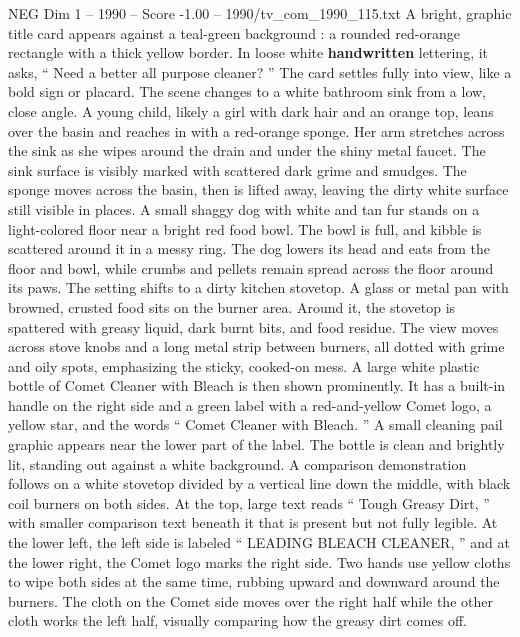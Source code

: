 \begin{textsample}{NEG Dim 1 – 1990 – Score -1.00 – 1990/tv\_com\_1990\_115.txt}  \label{ex:f1_neg_056}
A bright, graphic title card appears against a teal-green background : a rounded red-orange rectangle with a thick yellow border.
In loose white \textbf{handwritten} lettering, it asks, “ Need a better all purpose cleaner? ” The card settles fully into view, like a bold sign or placard.
The scene changes to a white bathroom sink from a low, close angle.
A young child, likely a girl with dark hair and an orange top, leans over the basin and reaches in with a red-orange sponge.
Her arm stretches across the sink as she wipes around the drain and under the shiny metal faucet.
The sink surface is visibly marked with scattered dark grime and smudges.
The sponge moves across the basin, then is lifted away, leaving the dirty white surface still visible in places.
A small shaggy dog with white and tan fur stands on a light-colored floor near a bright red food bowl.
The bowl is full, and kibble is scattered around it in a messy ring.
The dog lowers its head and eats from the floor and bowl, while crumbs and pellets remain spread across the floor around its paws.
The setting shifts to a dirty kitchen stovetop.
A glass or metal pan with browned, crusted food sits on the burner area.
Around it, the stovetop is spattered with greasy liquid, dark burnt bits, and food residue.
The view moves across stove knobs and a long metal strip between burners, all dotted with grime and oily spots, emphasizing the sticky, cooked-on mess.
A large white plastic bottle of Comet Cleaner with Bleach is then shown prominently.
It has a built-in handle on the right side and a green label with a red-and-yellow Comet logo, a yellow star, and the words “ Comet Cleaner with Bleach. ” A small cleaning pail graphic appears near the lower part of the label.
The bottle is clean and brightly lit, standing out against a white background.
A comparison demonstration follows on a white stovetop divided by a vertical line down the middle, with black coil burners on both sides.
At the top, large text reads “ Tough Greasy Dirt, ” with smaller comparison text beneath it that is present but not fully legible.
At the lower left, the left side is labeled “ LEADING BLEACH CLEANER, ” and at the lower right, the Comet logo marks the right side.
Two hands use yellow cloths to wipe both sides at the same time, rubbing upward and downward around the burners.
The cloth on the Comet side moves over the right half while the other cloth works the left half, visually comparing how the greasy dirt comes off.

\end{textsample}
